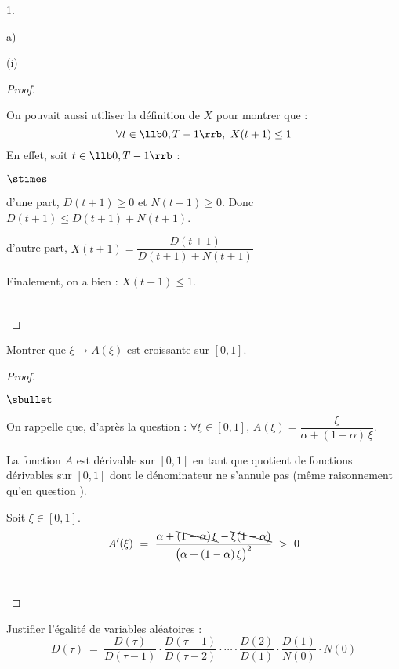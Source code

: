 \documentclass[11pt]{article}%
\begin{document}
\begin{noliste}{1.}
\begin{noliste}{a)}
\begin{nonoliste}{(i)}
\begin{proof}
        \begin{remark}
          On pouvait aussi utiliser la définition de $X$ pour montrer
          que : 
	  \[
	    \forall t \in \llb 0, T-1\rrb, \ X(t+1) \leq 1
          \]
          En effet, soit $t \in \llb 0, T-1\rrb$ :
          \begin{noliste}{$\stimes$}
            \item d'une part, $D(t+1) \geq 0$ et $N(t+1) \geq 0$. Donc 
            $D(t+1) \leq D(t+1) + N(t+1)$.
            \item d'autre part, $X(t+1) = \dfrac{D(t+1)}{D(t+1) + 
	    N(t+1)}$~\\
          \end{noliste}
          Finalement, on a bien : $X(t+1) \leq 1$.
        \end{remark}~\\[-1.4cm]
      \end{proof}

      
      \item Montrer que $\xi \mapsto A(\xi)$ est croissante sur $[0,1]$.
      
      \begin{proof}~
        \begin{noliste}{$\sbullet$}
	  \item On rappelle que, d'après la question  :
	  $\forall \xi \in [0,1]$, $A(\xi) = \dfrac{\xi}{\alpha +
	  (1-\alpha) \, \xi}$.
	  
	  \item La fonction $A$ est dérivable sur $[0,1]$ en tant que 
	  quotient de fonctions dérivables sur $[0,1]$ dont le 
	  dénominateur ne s'annule pas (même raisonnement qu'en question 
	  ).
	  
	  \item Soit $\xi \in [0,1]$.
	  \[
	    A'(\xi) \ = \ \dfrac{\alpha + \bcancel{(1-\alpha) \, \xi}
	    - \bcancel{\xi(1-\alpha)}}{\big(\alpha + (1-\alpha) \,
	    \xi \big)^2} \ > \ 0
	  \]
	  ~\\[-1.4cm]
        \end{noliste}
      \end{proof}
    \end{nonoliste}
  \end{noliste}
    
  \item Justifier l'égalité de variables aléatoires :
  \[
    D(\tau) \ = \ \dfrac{D(\tau)}{D(\tau-1)} \cdot \dfrac{D(\tau-1)}
    {D(\tau-2)} \cdot \cdots \cdot \dfrac{D(2)}{D(1)} \cdot 
    \dfrac{D(1)}{N(0)} \cdot N(0)
  \]
  

\end{noliste}
\end{document}
